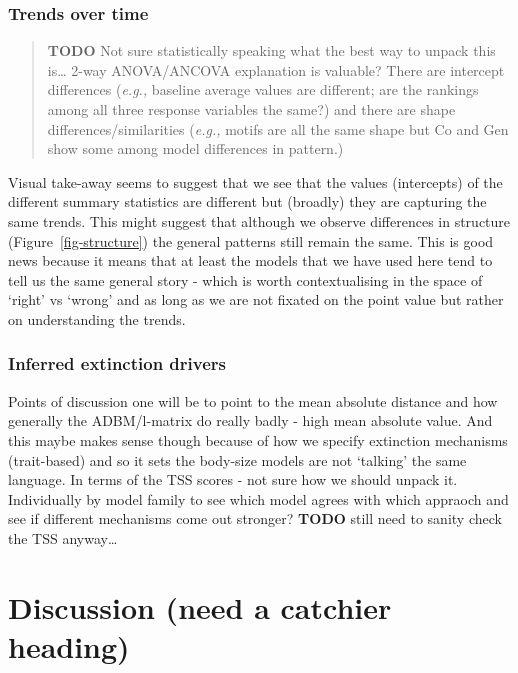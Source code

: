 \documentclass[
]{article}
\begin{document}
\subsubsection{Trends over time}\label{trends-over-time}

\begin{quote}
\textbf{TODO} Not sure statistically speaking what the best way to
unpack this is\ldots{} 2-way ANOVA/ANCOVA explanation is valuable? There
are intercept differences (\emph{e.g.,} baseline average values are
different; are the rankings among all three response variables the
same?) and there are shape differences/similarities (\emph{e.g.,} motifs
are all the same shape but Co and Gen show some among model differences
in pattern.)
\end{quote}

Visual take-away seems to suggest that we see that the values
(intercepts) of the different summary statistics are different but
(broadly) they are capturing the same trends. This might suggest that
although we observe differences in structure
(Figure~\ref{fig-structure}) the general patterns still remain the same.
This is good news because it means that at least the models that we have
used here tend to tell us the same general story - which is worth
contextualising in the space of `right' vs `wrong' and as long as we are
not fixated on the point value but rather on understanding the trends.

\subsubsection{Inferred extinction
drivers}\label{inferred-extinction-drivers}

Points of discussion one will be to point to the mean absolute distance
and how generally the ADBM/l-matrix do really badly - high mean absolute
value. And this maybe makes sense though because of how we specify
extinction mechanisms (trait-based) and so it sets the body-size models
are not `talking' the same language. In terms of the TSS scores - not
sure how we should unpack it. Individually by model family to see which
model agrees with which appraoch and see if different mechanisms come
out stronger? \textbf{TODO} still need to sanity check the TSS
anyway\ldots{}

\section{Discussion (need a catchier
heading)}\label{discussion-need-a-catchier-heading}
\end{document}
